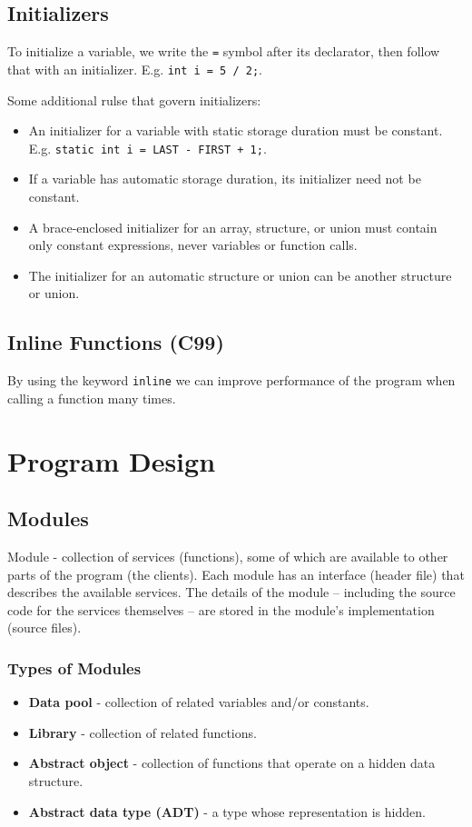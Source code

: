 \documentclass[openany]{book}
\begin{document}
    \section{Initializers}
    To initialize a variable, we write the \texttt{=} symbol after its declarator, then follow that with an initializer. E.g. \texttt{int i = 5 / 2;}.

    Some additional rulse that govern initializers:
    \begin{itemize}
        \item An initializer for a variable with static storage duration must be constant. E.g. \texttt{static int i = LAST - FIRST + 1;}.
        \item If a variable has automatic storage duration, its initializer need not be constant.
        \item A brace-enclosed initializer for an array, structure, or union must contain only constant expressions, never variables or function calls.
        \item The initializer for an automatic structure or union can be another structure or union.
    \end{itemize}

    \section{Inline Functions (C99)}
    By using the keyword \texttt{inline} we can improve performance of the program when calling a function many times.

    

    \chapter{Program Design}

    \section{Modules}
    Module - collection of services (functions), some of which are available to other parts of the program (the clients). Each module has an interface (header file) that describes the available services. The details of the module -- including the source code for the services themselves -- are stored in the module's implementation (source files).

    \subsection*{Types of Modules}
    \begin{itemize}
        \item \textbf{Data pool} - collection of related variables and/or constants.
        \item \textbf{Library} - collection of related functions.
        \item \textbf{Abstract object} - collection of functions that operate on a hidden data structure.
        \item \textbf{Abstract data type (ADT)} - a type whose representation is hidden.
    \end{itemize}
\end{document}
